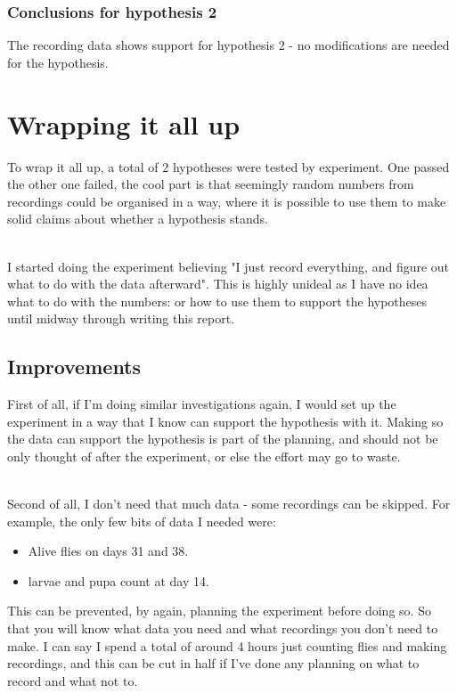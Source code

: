 \documentclass{article}
\begin{document}
\subsubsection{Conclusions for hypothesis 2}

The recording data shows support for hypothesis 2 - no modifications are needed for the hypothesis.

\section{Wrapping it all up}

To wrap it all up, a total of 2 hypotheses were tested by experiment. One passed the other one failed, the cool part is that seemingly random numbers from recordings could be organised in a way, where it is possible to use them to make solid claims about whether a hypothesis stands.

\noindent\\
I started doing the experiment believing "I just record everything, and figure out what to do with the data afterward". This is highly unideal as I have no idea what to do with the numbers: or how to use them to support the hypotheses until midway through writing this report.

\subsection{Improvements}

First of all, if I'm doing similar investigations again, I would set up the experiment in a way that I know can support the hypothesis with it. Making so the data can support the hypothesis is part of the planning, and should not be only thought of after the experiment, or else the effort may go to waste.

\noindent\\
Second of all, I don't need that much data - some recordings can be skipped. For example, the only few bits of data I needed were:

\begin{itemize}
  \item Alive flies on days 31 and 38.
  \item larvae and pupa count at day 14.
\end{itemize}

\noindent
This can be prevented, by again, planning the experiment before doing so. So that you will know what data you need and what recordings you don't need to make. I can say I spend a total of around 4 hours just counting flies and making recordings, and this can be cut in half if I've done any planning on what to record and what not to.
\end{document}
